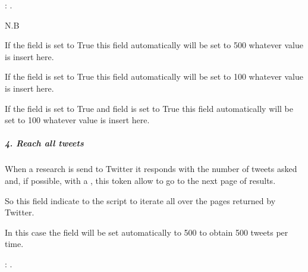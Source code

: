 \documentclass[letterpaper,10pt,english]{sphinxmanual}
\begin{document}
\begin{DUlineblock}{0em}
\item[] : .
\end{DUlineblock}

\begin{DUlineblock}{0em}
\item[] N.B
\item[] If the  field is set to True this field automatically will be set to 500 whatever value is insert here.
\item[] If the  field is set to True this field automatically will be set to 100 whatever value is insert here.
\item[] If the  field is set to True and  field is set to True this field automatically will be set to 100 whatever value is insert here.
\end{DUlineblock}


\subparagraph{4. Reach all tweets}
\label{\detokenize{guide/tweet_search_guide:reach-all-tweets}}
\begin{sphinxVerbatim}[commandchars=\\\{\}]
 
\end{sphinxVerbatim}

\begin{DUlineblock}{0em}
\item[] When a research is send to Twitter it responds with the number of tweets asked and, if possible, with a , this token allow to go to the next page of results.
\item[] So this field indicate to the script to iterate all over the pages returned by Twitter.
\item[] In this case the  field will be set automatically to 500 to obtain 500 tweets per time.
\end{DUlineblock}

\begin{DUlineblock}{0em}
\item[] : .
\end{DUlineblock}
\end{document}
